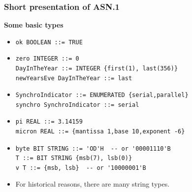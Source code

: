 \documentclass[compress,dvips,xcolor={dvipsnames},t]{beamer}
\newcommand\ASN{\textsf{ASN.1}\xspace}
\begin{document}
\begin{frame}[containsverbatim]
\frametitle{Short presentation of \ASN}

\noindent
\textbf{Some basic types}
\begin{itemize}

  \item \verb+ok BOOLEAN ::= TRUE+


  \item

\begin{verbatim}
zero INTEGER ::= 0
DayInTheYear ::= INTEGER {first(1), last(356)}
newYearsEve DayInTheYear ::= last
\end{verbatim}

  \item
\begin{verbatim}
SynchroIndicator ::= ENUMERATED {serial,parallel}
synchro SynchroIndicator ::= serial
\end{verbatim}

  \item

\begin{verbatim}
pi REAL ::= 3.14159
micron REAL ::= {mantissa 1,base 10,exponent -6}
\end{verbatim}

  \item

\begin{verbatim}
byte BIT STRING ::= 'OD'H  -- or '00001110'B
T ::= BIT STRING {msb(7), lsb(0)}
v T ::= {msb, lsb}  -- or '10000001'B
\end{verbatim}



  \item For historical reasons, there are many string types.

\end{itemize}

\end{frame}
\end{document}
